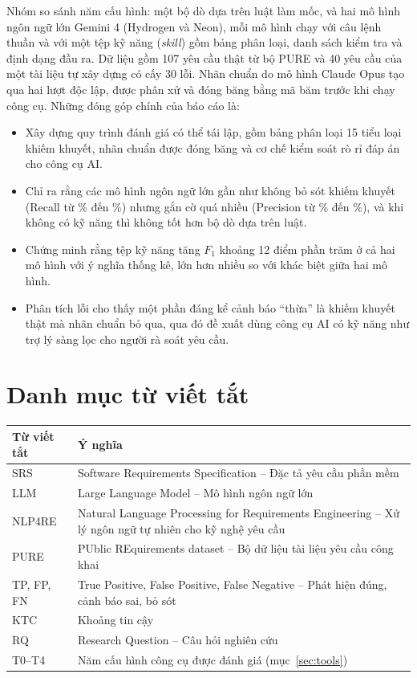 \documentclass[12pt,a4paper]{report}
\begin{document}
Nhóm so sánh năm cấu hình: một bộ dò dựa trên luật làm mốc, và hai mô hình ngôn ngữ lớn Gemini 4 (Hydrogen và Neon), mỗi mô hình chạy với câu lệnh thuần và với một tệp kỹ năng (\textit{skill}) gồm bảng phân loại, danh sách kiểm tra và định dạng đầu ra. Dữ liệu gồm 107 yêu cầu thật từ bộ PURE và 40 yêu cầu của một tài liệu tự xây dựng có cấy 30 lỗi. Nhãn chuẩn do mô hình Claude Opus tạo qua hai lượt độc lập, được phân xử và đóng băng bằng mã băm trước khi chạy công cụ. Những đóng góp chính của báo cáo là:
\begin{itemize}
  \item Xây dựng quy trình đánh giá có thể tái lập, gồm bảng phân loại 15 tiểu loại khiếm khuyết, nhãn chuẩn được đóng băng và cơ chế kiểm soát rò rỉ đáp án cho công cụ AI.
  \item Chỉ ra rằng các mô hình ngôn ngữ lớn gần như không bỏ sót khiếm khuyết (Recall từ \numRTfour\% đến \numRTone\%) nhưng gắn cờ quá nhiều (Precision từ \numPTone\% đến \numPTfour\%), và khi không có kỹ năng thì không tốt hơn bộ dò dựa trên luật.
  \item Chứng minh rằng tệp kỹ năng tăng $F_1$ khoảng 12 điểm phần trăm ở cả hai mô hình với ý nghĩa thống kê, lớn hơn nhiều so với khác biệt giữa hai mô hình.
  \item Phân tích lỗi cho thấy một phần đáng kể cảnh báo ``thừa'' là khiếm khuyết thật mà nhãn chuẩn bỏ qua, qua đó đề xuất dùng công cụ AI có kỹ năng như trợ lý sàng lọc cho người rà soát yêu cầu.
\end{itemize}

\tableofcontents
\listoffigures
\listoftables

\chapter*{Danh mục từ viết tắt}
\begin{tabular}{p{2.6cm}p{12cm}}
\toprule
\textbf{Từ viết tắt} & \textbf{Ý nghĩa} \\
\midrule
SRS & Software Requirements Specification -- Đặc tả yêu cầu phần mềm \\
LLM & Large Language Model -- Mô hình ngôn ngữ lớn \\
NLP4RE & Natural Language Processing for Requirements Engineering -- Xử lý ngôn ngữ tự nhiên cho kỹ nghệ yêu cầu \\
PURE & PUblic REquirements dataset -- Bộ dữ liệu tài liệu yêu cầu công khai \\
TP, FP, FN & True Positive, False Positive, False Negative -- Phát hiện đúng, cảnh báo sai, bỏ sót \\
KTC & Khoảng tin cậy \\
RQ & Research Question -- Câu hỏi nghiên cứu \\
T0--T4 & Năm cấu hình công cụ được đánh giá (mục~\ref{sec:tools}) \\
\bottomrule
\end{tabular}
\end{document}
